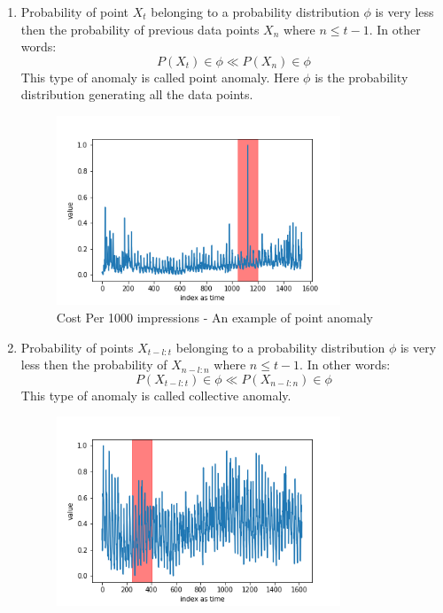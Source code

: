 \documentclass[12pt]{article}
\begin{document}
\begin{enumerate}
    \item Probability of point $X_t$ belonging to a probability distribution $\phi$ is very less then the probability of previous data points $X_n$ where $n \leq t-1$. In other words:\\
    \begin{equation}
        P(X_t) \in \phi  \ll P(X_n) \in \phi 
    \end{equation}
    This type of anomaly is called point anomaly. Here $\phi$ is the probability distribution generating all the data points.
            \begin{figure}[H]
\centering
        \includegraphics[width=0.8\textwidth]{images/dataAnomalies/ad/exchange-3_cpm_results.png}
    \caption{Cost Per 1000 impressions - An example of point anomaly}
    \label{examleOfPointAnomaly}
\end{figure}
    \item Probability of points $X_{t-l:t}$ belonging to a probability distribution $\phi$ is very less then the probability of $X_{n-l:n}$ where $n \leq t-1$. In other words: \\
    \begin{equation}
        P(X_{t-l:t}) \in \phi  \ll P(X_{n-l:n}) \in \phi         
    \end{equation}
        This type of anomaly is called collective anomaly.
        \begin{figure}[H]
\centering
        \includegraphics[width=0.8\textwidth]{images/dataAnomalies/ad/exchange-2_cpc_results.png}

\end{figure}
\end{enumerate}
\end{document}
